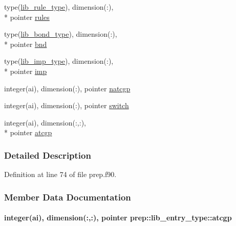 \begin{DoxyCompactItemize}
type(\hyperlink{structprep_1_1lib__rule__type}{lib\-\_\-rule\-\_\-type}), dimension(\-:), \\*
pointer \hyperlink{structprep_1_1lib__entry__type_ad626ae881825fdd49045c7f178c0cc49}{rules}
\item 
type(\hyperlink{structprep_1_1lib__bond__type}{lib\-\_\-bond\-\_\-type}), dimension(\-:), \\*
pointer \hyperlink{structprep_1_1lib__entry__type_a9362862a57577cab41a136de040ef535}{bnd}
\item 
type(\hyperlink{structprep_1_1lib__imp__type}{lib\-\_\-imp\-\_\-type}), dimension(\-:), \\*
pointer \hyperlink{structprep_1_1lib__entry__type_a84249dbd497a66b7abd53d63868d2fda}{imp}
\item 
integer(ai), dimension(\-:), pointer \hyperlink{structprep_1_1lib__entry__type_ade6d0dcfac0155244fa2178ad86265ec}{natcgp}
\item 
integer(ai), dimension(\-:), pointer \hyperlink{structprep_1_1lib__entry__type_a1d0f6d127268316ea2593822bb051da1}{switch}
\item 
integer(ai), dimension(\-:,\-:), \\*
pointer \hyperlink{structprep_1_1lib__entry__type_a90009626b8f900add1a17c857c21f263}{atcgp}
\end{DoxyCompactItemize}


\subsubsection{Detailed Description}


Definition at line 74 of file prep.\-f90.



\subsubsection{Member Data Documentation}
\hypertarget{structprep_1_1lib__entry__type_a90009626b8f900add1a17c857c21f263}{
\paragraph[{atcgp}]{\setlength{\rightskip}{0pt plus 5cm}integer(ai), dimension(\-:,\-:), pointer prep\-::lib\-\_\-entry\-\_\-type\-::atcgp}}\label{structprep_1_1lib__entry__type_a90009626b8f900add1a17c857c21f263}


